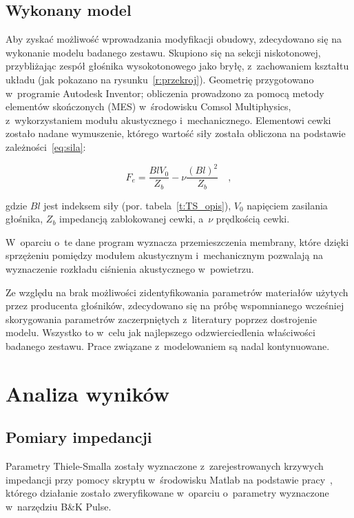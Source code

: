\documentclass[12pt]{oska}
\begin{document}
	\subsection{Wykonany model}
	
	Aby zyskać możliwość wprowadzania modyfikacji obudowy, zdecydowano się na wykonanie modelu badanego zestawu. Skupiono się na sekcji niskotonowej, przybliżając zespół głośnika wysokotonowego jako bryłę, z~zachowaniem kształtu układu (jak pokazano na rysunku~\ref{r:przekroj}). Geometrię przygotowano w~programie Autodesk Inventor; obliczenia prowadzono za pomocą metody elementów skończonych (MES) w~środowisku Comsol Multiphysics, z~wykorzystaniem modułu akustycznego i~mechanicznego. Elementowi cewki zostało nadane wymuszenie, którego wartość siły została obliczona na podstawie zależności~\eqref{eq:sila}:
	
	\begin{equation}
	F_e=\frac{BlV_0}{Z_b}-\nu\frac{(Bl)^2}{Z_b} \quad, \label{eq:sila}
	\end{equation}
	
	\noindent gdzie $Bl$ jest indeksem siły (por. tabela~\ref{t:TS_opis}), $V_0$ napięciem zasilania głośnika, $Z_b$ impedancją zablokowanej cewki, a~$\nu$ prędkością cewki. 
	
	W~oparciu o~te dane program wyznacza przemieszczenia membrany, które dzięki sprzężeniu pomiędzy modułem akustycznym i~mechanicznym pozwalają na wyznaczenie rozkładu ciśnienia akustycznego w~powietrzu.
	
	Ze względu na brak możliwości zidentyfikowania parametrów materiałów użytych przez producenta głośników, zdecydowano się na próbę wspomnianego wcześniej skorygowania parametrów zaczerpniętych z~literatury \cite{modelowanie} poprzez dostrojenie modelu. Wszystko to w~celu jak najlepszego odzwierciedlenia właściwości badanego zestawu. Prace związane z~modelowaniem są nadal kontynuowane.
	
	
	\section{Analiza wyników}
	
	\subsection{Pomiary impedancji}
	
	Parametry Thiele-Smalla zostały wyznaczone z~zarejestrowanych krzywych impedancji przy pomocy skryptu w~środowisku Matlab na podstawie pracy~\cite{dobrucki}, którego działanie zostało zweryfikowane w~oparciu o~parametry wyznaczone w~narzędziu B\&K Pulse. 
	
\end{document}

